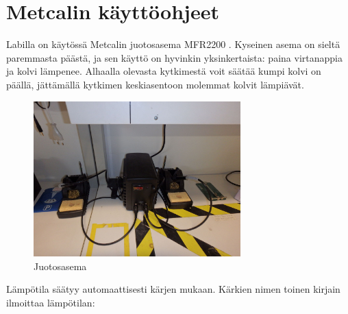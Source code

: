 \documentclass[pdftex,a4paper]{article}
\begin{document}
 
\section*{Metcalin k\"aytt\"oohjeet}

Labilla on k\"ayt\"oss\"a Metcalin juotosasema MFR2200 \cite{MetcalMFR2200}. Kyseinen asema on sielt\"a paremmasta p\"a\"ast\"a, ja sen k\"aytt\"o on hyvinkin yksinkertaista: paina virtanappia ja kolvi l\"ampenee. Alhaalla olevasta kytkimest\"a voit s\"a\"at\"a\"a kumpi kolvi on p\"a\"all\"a, j\"att\"am\"all\"a kytkimen keskiasentoon molemmat kolvit l\"ampi\"av\"at. 

\begin{figure}[htb]
  \begin{center}
    \includegraphics[height=6cm]{images/mfr2200.jpg}
  \end{center}
  \caption{\label{img:mfr2200} Juotosasema}
\end{figure}

L\"amp\"otila s\"a\"atyy automaattisesti k\"arjen mukaan. K\"arkien nimen toinen  kirjain ilmoittaa l\"amp\"otilan:

\begin{table}[htb]
\caption{\label{tbl:tip_naming_scheme_temp} K\"arkien l\"amp\"otila \cite[p. 32]{MetcalTips}}
\begin{center}
\end{center}
\end{table}
\end{document}
